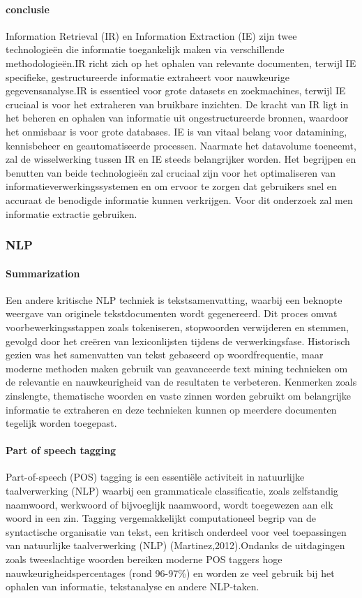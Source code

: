  \paragraph{conclusie}
 Information Retrieval (IR) en Information Extraction (IE) zijn twee technologieën die informatie toegankelijk maken via verschillende methodologieën.IR richt zich op het ophalen van relevante documenten, terwijl IE specifieke, gestructureerde informatie extraheert voor nauwkeurige gegevensanalyse.IR is essentieel voor grote datasets en zoekmachines, terwijl IE cruciaal is voor het extraheren van bruikbare inzichten. De kracht van IR ligt in het beheren en ophalen van informatie uit ongestructureerde bronnen, waardoor het onmisbaar is voor grote databases. IE is van vitaal belang voor datamining, kennisbeheer en geautomatiseerde processen. Naarmate het datavolume toeneemt, zal de wisselwerking tussen IR en IE steeds belangrijker worden. Het begrijpen en benutten van beide technologieën zal cruciaal zijn voor het optimaliseren van informatieverwerkingssystemen en om ervoor te zorgen dat gebruikers snel en accuraat de benodigde informatie kunnen verkrijgen. Voor dit onderzoek zal men informatie extractie gebruiken.
 
\subsubsection{NLP}
\paragraph{Summarization}

Een andere kritische NLP techniek is tekstsamenvatting, waarbij een beknopte weergave van originele tekstdocumenten wordt gegenereerd. Dit proces omvat voorbewerkingsstappen zoals tokeniseren, stopwoorden verwijderen en stemmen, gevolgd door het creëren van lexiconlijsten tijdens de verwerkingsfase. Historisch gezien was het samenvatten van tekst gebaseerd op woordfrequentie, maar moderne methoden maken gebruik van geavanceerde text mining technieken om de relevantie en nauwkeurigheid van de resultaten te verbeteren. Kenmerken zoals zinslengte, thematische woorden en vaste zinnen worden gebruikt om belangrijke informatie te extraheren en deze technieken kunnen op meerdere documenten tegelijk worden toegepast\autocite{Talib2016TextMining}.

\paragraph{Part of speech tagging}
Part-of-speech (POS) tagging is een essentiële activiteit in natuurlijke taalverwerking (NLP) waarbij een grammaticale classificatie, zoals zelfstandig naamwoord, werkwoord of bijvoeglijk naamwoord, wordt toegewezen aan elk woord in een zin. Tagging vergemakkelijkt computationeel begrip van de syntactische organisatie van tekst, een kritisch onderdeel voor veel toepassingen van natuurlijke taalverwerking (NLP) (Martinez,2012).Ondanks de uitdagingen zoals tweeslachtige woorden bereiken moderne POS taggers hoge nauwkeurigheidspercentages (rond 96-97\%) en worden ze veel gebruik bij het ophalen van informatie, tekstanalyse en andere NLP-taken\autocite{Martinez2024}.
